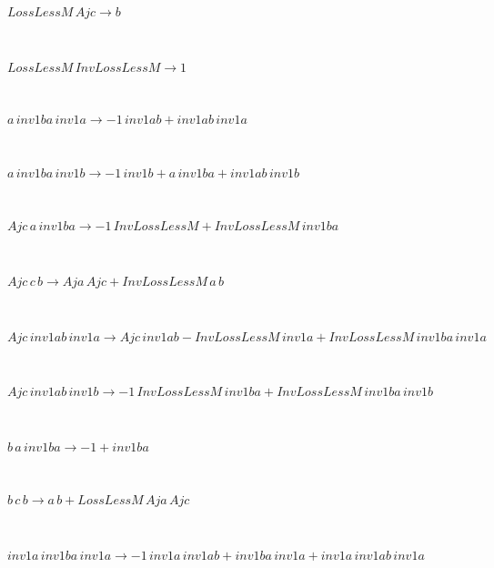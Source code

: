 \begin{minipage}{6in}
$
LossLessM\,
 Ajc\rightarrow b
$
\end{minipage}\medskip \\
\begin{minipage}{6in}
$
LossLessM\,
 InvLossLessM\rightarrow 1
$
\end{minipage}\medskip \\
\begin{minipage}{6in}
$
a\,
 inv1ba\,
 inv1a\rightarrow -1\,
 inv1ab + inv1ab\,
 inv1a
$
\end{minipage}\medskip \\
\begin{minipage}{6in}
$
a\,
 inv1ba\,
 inv1b\rightarrow -1\,
 inv1b + a\,
 inv1ba + inv1ab\,
 inv1b
$
\end{minipage}\medskip \\
\begin{minipage}{6in}
$
Ajc\,
 a\,
 inv1ba\rightarrow -1\,
 InvLossLessM + InvLossLessM\,
 inv1ba
$
\end{minipage}\medskip \\
\begin{minipage}{6in}
$
Ajc\,
 c\,
 b\rightarrow Aja\,
 Ajc + InvLossLessM\,
 a\,
 b
$
\end{minipage}\medskip \\
\begin{minipage}{6in}
$
Ajc\,
 inv1ab\,
 inv1a\rightarrow Ajc\,
 inv1ab - InvLossLessM\,
 inv1a + InvLossLessM\,
 inv1ba\,
 inv1a
$
\end{minipage}\medskip \\
\begin{minipage}{6in}
$
Ajc\,
 inv1ab\,
 inv1b\rightarrow -1\,
 InvLossLessM\,
 inv1ba + InvLossLessM\,
 inv1ba\,
 inv1b
$
\end{minipage}\medskip \\
\begin{minipage}{6in}
$
b\,
 a\,
 inv1ba\rightarrow -1 + inv1ba
$
\end{minipage}\medskip \\
\begin{minipage}{6in}
$
b\,
 c\,
 b\rightarrow a\,
 b + LossLessM\,
 Aja\,
 Ajc
$
\end{minipage}\medskip \\
\begin{minipage}{6in}
$
inv1a\,
 inv1ba\,
 inv1a\rightarrow -1\,
 inv1a\,
 inv1ab + inv1ba\,
 inv1a + inv1a\,
 inv1ab\,
 inv1a
$
\end{minipage}\medskip \\

